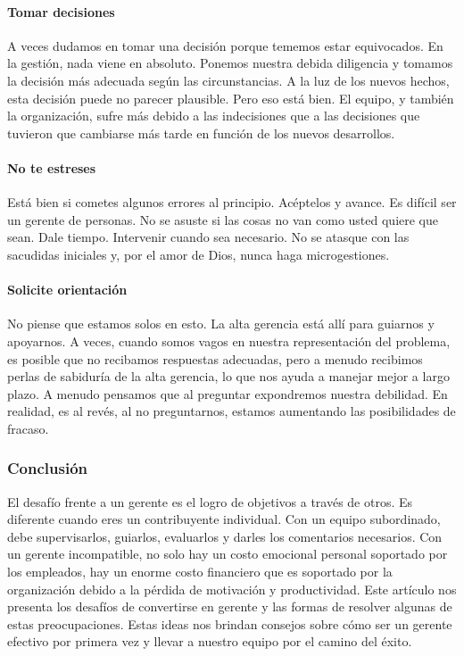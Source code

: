 \documentclass[10pt]{book}
\begin{document}
\paragraph{Tomar decisiones}
A veces dudamos en tomar una decisión porque tememos estar equivocados. En la gestión, nada viene en absoluto. Ponemos nuestra debida diligencia y tomamos la decisión más adecuada según las circunstancias. A la luz de los nuevos hechos, esta decisión puede no parecer plausible. Pero eso está bien. El equipo, y también la organización, sufre más debido a las indecisiones que a las decisiones que tuvieron que cambiarse más tarde en función de los nuevos desarrollos.
\paragraph{No te estreses}
Está bien si cometes algunos errores al principio. Acéptelos y avance. Es difícil ser un gerente de personas. No se asuste si las cosas no van como usted quiere que sean. Dale tiempo. Intervenir cuando sea necesario. No se atasque con las sacudidas iniciales y, por el amor de Dios, nunca haga microgestiones.
\paragraph{Solicite orientación}
No piense que estamos solos en esto. La alta gerencia está allí para guiarnos y apoyarnos. A veces, cuando somos vagos en nuestra representación del problema, es posible que no recibamos respuestas adecuadas, pero a menudo recibimos perlas de sabiduría de la alta gerencia, lo que nos ayuda a manejar mejor a largo plazo. A menudo pensamos que al preguntar expondremos nuestra debilidad. En realidad, es al revés, al no preguntarnos, estamos aumentando las posibilidades de fracaso.
\subsubsection{Conclusión}
El desafío frente a un gerente es el logro de objetivos a través de otros. Es diferente cuando eres un contribuyente individual. Con un equipo subordinado, debe supervisarlos, guiarlos, evaluarlos y darles los comentarios necesarios. Con un gerente incompatible, no solo hay un costo emocional personal soportado por los empleados, hay un enorme costo financiero que es soportado por la organización debido a la pérdida de motivación y productividad. Este artículo nos presenta los desafíos de convertirse en gerente y las formas de resolver algunas de estas preocupaciones. Estas ideas nos brindan consejos sobre cómo ser un gerente efectivo por primera vez y llevar a nuestro equipo por el camino del éxito.
\end{document}
